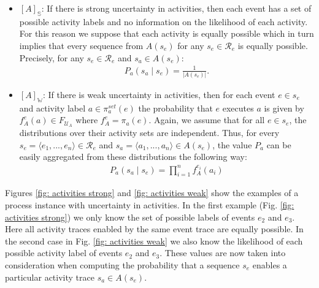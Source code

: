 \begin{itemize}
\item
\underline{$[A]_{\mathbb{S}}$}:
If there is strong uncertainty in activities, then each event has a set of possible activity labels and no information on the likelihood of each activity.
For this reason we suppose that each activity is equally possible which in turn implies that every sequence from $A(s_e)$ for any $s_e \in \mathcal{R}_e$ is equally possible.
Precisely, for any $s_e \in \mathcal{R}_e$ and $s_a \in A(s_e)$:
\begin{align*}
P_a(s_a \mid s_e) = \frac{1}{|A(s_e)|}.
\end{align*}

\item
\underline{$[A]_{\mathbb{W}}$}:
If there is weak uncertainty in activities, then for each event $e \in s_e$ and activity label $a \in \pi_a^{set}(e)$ the probability that $e$ executes $a$ is given by $f_A^e(a) \in F_{\mathcal{U}_A}$ where $f_A^e = \pi_a(e)$.
Again, we assume that for all $e \in s_e$, the distributions over their activity sets are independent.
Thus, for every $s_e=\langle e_1,...,e_n \rangle \in \mathcal{R}_e$ and $s_a = \langle a_1,...,a_n \rangle \in A(s_e)$, the value $P_a$ can be easily aggregated from these distributions the following way:
\begin{align*}
P_a(s_a \mid s_e) = \prod_{i=1}^{n} f_A^{e_i}(a_i) 
\end{align*}
\end{itemize}
Figures \ref{fig: activities strong} and \ref{fig: activities weak} show the examples of a process instance with uncertainty in activities.
In the first example (Fig. \ref{fig: activities strong}) we only know the set of possible labels of events $e_2$ and $e_3$.
Here all activity traces enabled by the same event trace are equally possible.
In the second case in Fig. \ref{fig: activities weak} we also know the likelihood of each possible activity label of events $e_2$ and $e_3$.
These values are now taken into consideration when computing the probability that a sequence $s_e$ enables a particular activity trace $s_a \in A(s_e)$.
%
%
%
%
%
